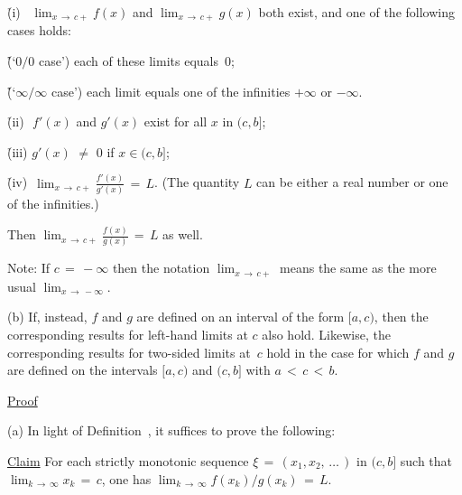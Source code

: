         \h (i)\,\,\, $\lim_{x  \,{\rightarrow}\, c+} f(x)$ and $\lim_{x  \,{\rightarrow}\,  c+} g(x)$ both exist,
    and one of the following cases holds:

        \h \h (`$0/0$ case') each of these limits equals~$0$;

        \h \h (`${\infty}/{\infty}$ case') each limit equals one of the infinities $+{\infty}$ or $-{\infty}$.

        \h (ii)\,\, $f'(x)$ and $g'(x)$ exist for all $x$ in $(c,b]$;

        \h (iii) $g'(x) \,\,{\neq}\,\, 0$ if $x{\in}(c,b]$;

        \h (iv)\, ${\displaystyle \lim_{x  \,{\rightarrow}\, c+} \frac{f'(x)}{g'(x)}} \,=\, L$.
    (The quantity $L$ can be either a real number or one of the infinities.)

\noindent Then ${\displaystyle \lim_{x \,{\rightarrow}\, c+} \frac{f(x)}{g(x)} \,=\, L}$ as well.

\noindent Note: If $c \,=\, -{\infty}$ then the notation $\lim_{x \,{\rightarrow}\, c+}$ means the same as the more usual $\lim_{x \,{\rightarrow}\, -{\infty}}$.

\V

        (b) If, instead, $f$ and $g$ are defined on an interval of the form $[a,c)$, then the corresponding results for left-hand limits at $c$ also hold.
    Likewise, the corresponding results for two-sided limits at~$c$ hold in the case for which $f$ and $g$ are defined on the intervals $[a,c)$ and $(c,b]$ with $a\,<\,c\,<\,b$.

\V

        \underline{Proof}

\V


        (a) In light of Definition~, it suffices to prove the following:

\V

    \h \underline{Claim} For each strictly monotonic sequence ${\xi} \,=\, (x_{1},x_{2},\,{\ldots}\,)$ in $(c,b]$ such that $\lim_{k \,{\rightarrow}\, {\infty}} x_{k} \,=\, c$,
    one has $\lim_{k \,{\rightarrow}\, {\infty}} f(x_{k})/g(x_{k}) \,=\, L$.

\V

